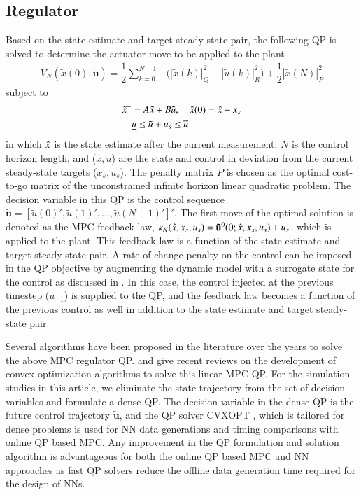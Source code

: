 \documentclass[preprint,5p, twocolumn, authoryear]{elsarticle}
\begin{document}
\subsection{Regulator}
Based on the state estimate and target steady-state pair, the following QP is
solved to determine the actuator move to be applied to the plant
\begin{align} \label{eqn:regulator}
    V_N(\tilde{x}(0), \mathbf{\tilde{u}}) = \dfrac{1}{2}\sum_{k=0}^{N-1} & 
    \Big(|\tilde{x}(k)|^2_Q  + |\tilde{u}(k)|^2_R \Big) + 
    \dfrac{1}{2}|\tilde{x}(N)|^2_P
\end{align}
subject to 
\begin{align}
    \tilde{x}^+ &= A\tilde{x} + B\tilde{u}, \quad \tilde{x}(0) = \hat{x} - x_s \\
    &\underline{u} \leq \tilde{u} + u_s \leq \overline{u}
    \label{eqn:regulator_constraints}
\end{align}
in which $\hat{x}$ is the state estimate after the current measurement, $N$ is the
control horizon length, and ($\tilde{x}, \tilde{u}$) are the state and control
in deviation from the current steady-state targets ($x_s, u_s$). The penalty
matrix $P$ is chosen as the optimal cost-to-go matrix of the unconstrained
infinite horizon linear quadratic problem. The decision variable in this QP is
the control sequence $\mathbf{\tilde{u}} = [\tilde{u}(0)', \tilde{u}(1)', ...,
\tilde{u}(N-1)']'$. The first move of the optimal solution is denoted as the MPC
feedback law, $\kappa_N(\hat{x}, x_s, u_s) = \mathbf{\tilde{u}}^0(0;\hat{x}, x_s,
u_s) + u_s$, which is applied to the plant. This feedback law is a function of
the state estimate and target steady-state pair. A rate-of-change penalty on the
control can be imposed in the QP objective by augmenting the dynamic model with
a surrogate state for the control as discussed in \cite*{rao:rawlings:1999}. In
this case, the control injected at the previous timestep ($u_{-1}$) is supplied
to the QP, and the feedback law becomes a function of the previous control as
well in addition to the state estimate and target steady-state pair.

Several algorithms have been proposed in the literature over the years to solve
the above MPC regulator QP. \cite*{kouzoupis:frison:zanelli:diehl:2018} and
\cite*{wright:2019} give recent reviews on the development of convex
optimization algorithms to solve this linear MPC QP. For the simulation studies
in this article, we eliminate the state trajectory from the set of decision
variables and formulate a dense QP. The decision variable in the dense QP is the
future control trajectory $\mathbf{\tilde{u}}$, and the QP solver CVXOPT
\citep*{vandenberghe:2010}, which is tailored for dense problems is used for NN
data generations and timing comparisons with online QP based MPC. Any
improvement in the QP formulation and solution algorithm is advantageous for
both the online QP based MPC and NN approaches as fast QP solvers reduce the
offline data generation time required for the design of NNs.
\end{document}
